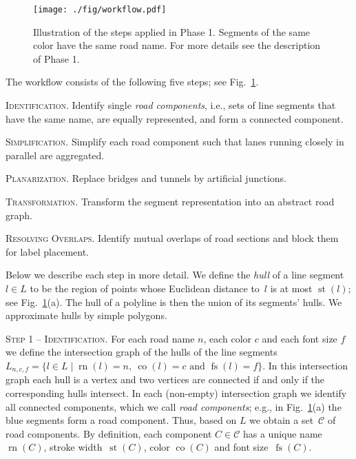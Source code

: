 \documentclass[a4paper,11pt]{article}
\DeclareMathOperator{\lFont}{fs}
\DeclareMathOperator{\lName}{rn}
\DeclareMathOperator{\lStroke}{st}
\DeclareMathOperator{\lColor}{co}
\begin{document}
\begin{figure}[t]
\centering
\texttt{[image: ./fig/workflow.pdf]}
\caption{Illustration of the steps applied in Phase 1. Segments of the same color have the same road name. For more details see the description of Phase 1. }
\label{fig:workflow}
\end{figure}

The workflow consists of the following five
steps; see Fig.~\ref{fig:workflow}.
\begin{inparaenum}[(1)]
\item \textsc{Identification.} Identify single \emph{road
    components}, i.e., sets of line segments that have the same name,
  are equally represented, and form a connected component.
\item \textsc{Simplification.} Simplify each road component such that lanes  running closely in parallel are aggregated. 
\item \textsc{Planarization.} Replace bridges and tunnels by artificial junctions. 
\item \textsc{Transformation.} Transform the segment representation into an abstract road graph. \item \textsc{Resolving Overlaps.} Identify mutual overlaps of road sections  and block them for label placement.
\end{inparaenum}

Below we describe each step in more detail. We define the
\emph{hull} of a line segment~$l\in L$ to be the region of points
whose Euclidean distance to~$l$ is at most $\lStroke(l)$; see
Fig.~\ref{fig:workflow}(a). The hull of a polyline is then the union of its segments' hulls. We approximate hulls by simple polygons.

\textsc{Step 1 -- Identification.}  For each road name $n$, each color
$c$ and each font size $f$ we define the intersection graph of the
hulls of the line segments $L_{n,c,f}=\{l\in L \mid \lName(l)=n,\ \lColor(l)=c \text{ and } \lFont(l)=f\}$. In this
intersection graph each hull is a vertex and two vertices are
connected if and only if the corresponding hulls intersect.  In each
(non-empty) intersection graph we identify all connected components,
which we call \emph{road components}; e.g., in
Fig.~\ref{fig:workflow}(a) the blue segments form a road
component. Thus, based on $L$ we obtain a set~$\mathcal C$ of road
components. By definition, each component $C\in \mathcal C$ has a
unique name~$\lName(C)$, stroke width~$\lStroke(C)$, color
$\lColor(C)$ and font size~$\lFont(C)$.
\end{document}
